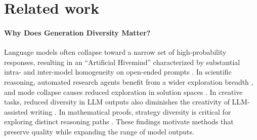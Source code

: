 
\section{Related work}
\label{sec:related_work}

\paragraph{Why Does Generation Diversity Matter?}
Language models often collapse toward a narrow set of high-probability responses, resulting in an ``Artificial Hivemind'' characterized by substantial intra- and inter-model homogeneity on open-ended prompts \citep{jiang2025artificialhivemindopenendedhomogeneity}.
In scientific reasoning, automated research agents benefit from a wider exploration breadth \citep{zou2026fmlbenchbenchmarkingmachinelearning}, and mode collapse causes reduced exploration in solution spaces \citep{yuan2026agenticredevolvingagenticsystems}. In creative tasks, reduced diversity in LLM outputs also diminishes the creativity of LLM-assisted writing \citep{abdulhai2026llmsdistortwrittenlanguage,Anderson2024HomogenizationEO,padmakumar2023does}. In mathematical proofs, strategy diversity is critical for exploring distinct reasoning paths \citep{Wu2025, Cao2025TowardsAM}. These findings motivate methods that preserve quality while expanding the range of model outputs.


